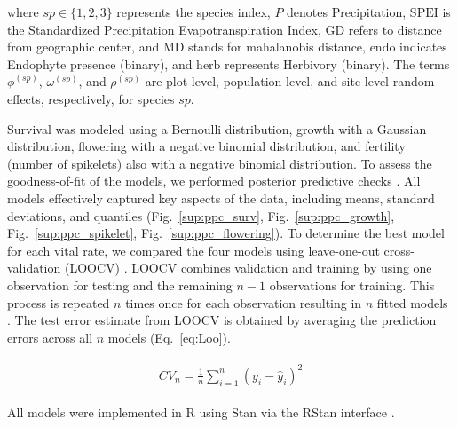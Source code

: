 \documentclass[12pt]{article}\usepackage[]{graphicx}\usepackage[dvipsnames]{xcolor}
\begin{document}
\noindent where \( sp \in \{1, 2, 3\} \) represents the species index, \( P \) denotes Precipitation, \( \text{SPEI} \) is the Standardized Precipitation Evapotranspiration Index, \( \text{GD} \) refers to distance from geographic center, and \( \text{MD} \) stands for mahalanobis distance, \( \text{endo} \) indicates Endophyte presence (binary), and \( \text{herb} \) represents Herbivory (binary). The terms \( \phi^{(sp)} \), \( \omega^{(sp)} \), and \( \rho^{(sp)} \) are plot-level, population-level, and site-level random effects, respectively, for species \( sp \).

Survival was modeled using a Bernoulli distribution, growth with a Gaussian distribution, flowering with a negative binomial distribution, and fertility (number of spikelets) also with a negative binomial distribution.
To assess the goodness-of-fit of the models, we performed posterior predictive checks \citep{gelman2000diagnostic, berkhof2000posterior}.  
All models effectively captured key aspects of the data, including means, standard deviations, and quantiles (Fig.~\ref{sup:ppc_surv}, Fig.~\ref{sup:ppc_growth}, Fig.~\ref{sup:ppc_spikelet}, Fig.~\ref{sup:ppc_flowering}).
To determine the best model for each vital rate, we compared the four models using leave-one-out cross-validation (LOOCV) \citep{vehtari2017practical}.  
LOOCV combines validation and training by using one observation for testing and the remaining $n-1$ observations for training.  
This process is repeated $n$ times once for each observation resulting in $n$ fitted models \citep{silva2024robust}.  
The test error estimate from LOOCV is obtained by averaging the prediction errors across all $n$ models (Eq.~\ref{eq:Loo}).

\begin{align}\label{eq:Loo}
\begin{split}
CV_{n} = \frac{1}{n} \sum_{i=1}^{n} (y_{i} - \hat{y}_{i})^2
\end{split}
\end{align}

All models were implemented in R \citep{RCoreTeam} using Stan via the RStan interface \citep{Rstan}.



\end{document}

